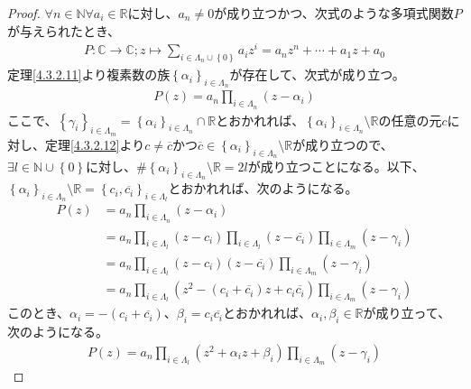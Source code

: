 \documentclass[dvipdfmx]{jsarticle}
\begin{document}
\begin{proof}
$\forall n \in \mathbb{N}\forall a_{i} \in \mathbb{R}$に対し、$a_{n} \neq 0$が成り立つかつ、次式のような多項式関数$P$が与えられたとき、
\begin{align*}
P:\mathbb{C} \rightarrow \mathbb{C};z \mapsto \sum_{i \in \varLambda_{n} \cup \left\{ 0 \right\}} {a_{i}z^{i}} = a_{n}z^{n} + \cdots + a_{1}z + a_{0}
\end{align*}
定理\ref{4.3.2.11}より複素数の族$\left\{ \alpha_{i} \right\}_{i \in \varLambda_{n}}$が存在して、次式が成り立つ。
\begin{align*}
P(z) = a_{n}\prod_{i \in \varLambda_{n}} \left( z - \alpha_{i} \right)
\end{align*}
ここで、$\left\{ \gamma_{i} \right\}_{i \in \varLambda_{m}} = \left\{ \alpha_{i} \right\}_{i \in \varLambda_{n}} \cap \mathbb{R}$とおかれれば、$\left\{ \alpha_{i} \right\}_{i \in \varLambda_{n}} \setminus \mathbb{R}$の任意の元$c$に対し、定理\ref{4.3.2.12}より$c \neq \overline{c}$かつ$\overline{c} \in \left\{ \alpha_{i} \right\}_{i \in \varLambda_{n}} \setminus \mathbb{R}$が成り立つので、$\exists l \in \mathbb{N} \cup \left\{ 0 \right\}$に対し、$\#{\left\{ \alpha_{i} \right\}_{i \in \varLambda_{n}} \setminus \mathbb{R}} = 2l$が成り立つことになる。以下、$\left\{ \alpha_{i} \right\}_{i \in \varLambda_{n}} \setminus \mathbb{R} = \left\{ c_{i},\overline{c_{i}} \right\}_{i \in \varLambda_{l}}$とおかれれば、次のようになる。
\begin{align*}
P(z) &= a_{n}\prod_{i \in \varLambda_{n}} \left( z - \alpha_{i} \right)\\
&= a_{n}\prod_{i \in \varLambda_{l}} \left( z - c_{i} \right)\prod_{i \in \varLambda_{l}} \left( z - \overline{c_{i}} \right)\prod_{i \in \varLambda_{m}} \left( z - \gamma_{i} \right)\\
&= a_{n}\prod_{i \in \varLambda_{l}} {\left( z - c_{i} \right)\left( z - \overline{c_{i}} \right)}\prod_{i \in \varLambda_{m}} \left( z - \gamma_{i} \right)\\
&= a_{n}\prod_{i \in \varLambda_{l}} \left( z^{2} - \left( c_{i} + \overline{c_{i}} \right)z + c_{i}\overline{c_{i}} \right)\prod_{i \in \varLambda_{m}} \left( z - \gamma_{i} \right)
\end{align*}
このとき、$\alpha_{i} = - \left( c_{i} + \overline{c_{i}} \right)$、$\beta_{i} = c_{i}\overline{c_{i}}$とおかれれば、$\alpha_{i},\beta_{i} \in \mathbb{R}$が成り立って、次のようになる。
\begin{align*}
P(z) = a_{n}\prod_{i \in \varLambda_{l}} \left( z^{2} + \alpha_{i}z + \beta_{i} \right)\prod_{i \in \varLambda_{m}} \left( z - \gamma_{i} \right)
\end{align*}
\end{proof}
\end{document}
